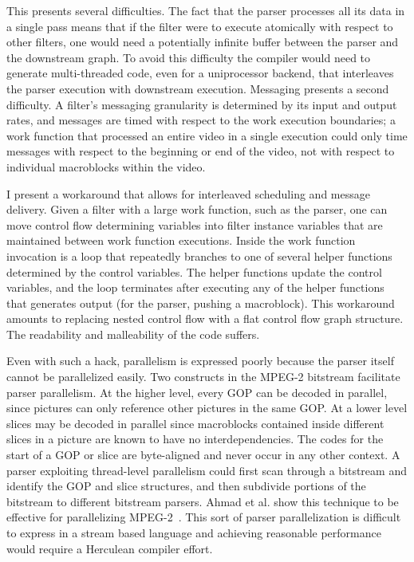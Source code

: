 This presents several difficulties. The fact that the parser processes all 
its data in a single pass means that if the filter were to execute atomically 
with respect to other filters, one would need a potentially infinite buffer 
between the parser and the downstream graph. To avoid this difficulty the 
compiler would need to generate multi-threaded code, even for a uniprocessor 
backend, that interleaves the parser execution with downstream execution. 
Messaging presents a second difficulty.
A filter's messaging granularity is determined by its input and output rates, 
and messages are timed with respect to the work execution boundaries; a work 
function that processed an entire video in a single execution could only 
time messages with respect to the beginning or end of the video, not with 
respect to individual macroblocks within the video.

I present a workaround that allows for interleaved scheduling and message 
delivery. Given a filter with a large work function, such as the parser, 
one can move control flow determining variables into filter instance 
variables that are maintained between work function executions. Inside 
the work function invocation is a loop that repeatedly branches to one 
of several helper functions determined by the control variables. The 
helper functions update the control variables, and the loop terminates 
after executing any of the helper functions that generates output (for 
the parser, pushing a macroblock). This workaround amounts to replacing 
nested control flow with a flat control flow graph structure. The 
readability and malleability of the code suffers. 

Even with such a hack, parallelism is expressed poorly because the parser 
itself cannot be parallelized easily. Two constructs in the MPEG-2 bitstream 
facilitate parser parallelism. At the higher level, every GOP can be decoded 
in parallel, since pictures can only reference other pictures in the same 
GOP. At a lower level slices may be decoded in parallel since macroblocks 
contained inside different slices in a picture are known to have no 
interdependencies. The codes for the start of a GOP or slice are 
byte-aligned and never occur in any other context. A parser exploiting
thread-level parallelism 
could first scan through a bitstream and identify the GOP and slice 
structures, and then subdivide portions of the bitstream to different 
bitstream parsers. Ahmad et al. show this technique to be 
effective for parallelizing MPEG-2~\cite{ahmadmpeg2encoder3}. 
This sort of parser parallelization is difficult to 
express in a stream based language and achieving reasonable performance 
would require a Herculean compiler effort.

